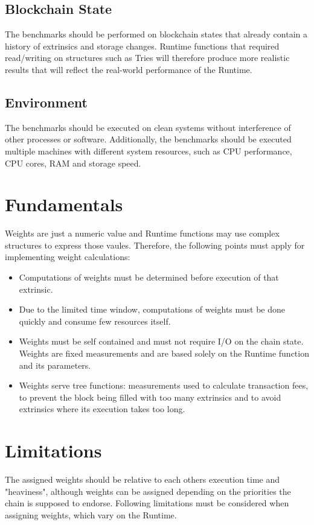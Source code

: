 \documentclass[11pt,a4paper]{article}
\begin{document}
\subsection{Blockchain State}
The benchmarks should be performed on blockchain states that already contain a history of
extrinsics and storage changes. Runtime functions that required read/writing on structures
such as Tries will therefore produce more realistic results that will reflect the real-world
performance of the Runtime.

\subsection{Environment}
The benchmarks should be executed on clean systems without interference of other processes
or software. Additionally, the benchmarks should be executed multiple machines with different
system resources, such as CPU performance, CPU cores, RAM and storage speed.

\section{Fundamentals}
Weights are just a numeric value and Runtime functions may use complex structures to express those
vaules. Therefore, the following points must apply for implementing weight calculations:
\begin{itemize}
\item Computations of weights must be determined before execution of that extrinsic.
\item Due to the limited time window, computations of weights must be done quickly and consume
      few resources itself.
\item Weights must be self contained and must not require I/O on the chain state. Weights are
      fixed measurements and are based solely on the Runtime function and its parameters.
\item Weights serve tree functions: measurements used to calculate transaction fees, to prevent
      the block being filled with too many extrinsics and to avoid extrinsics where its execution
      takes too long.
\end{itemize}

\section{Limitations}
The assigned weights should be relative to each others execution time and "heaviness",
although weights can be assigned depending on the priorities the chain is supposed to endorse.
Following limitations must be considered when assigning weights, which vary on the Runtime.
\end{document}
